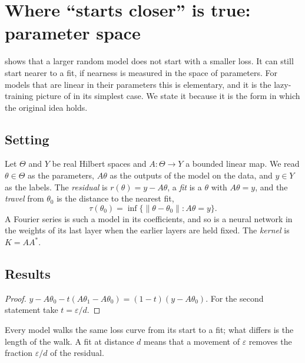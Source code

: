 \section{Where ``starts closer'' is true: parameter space}
\label{sec:param}

 shows that a larger random model does not start with a
smaller loss. It can still start nearer to a fit, if nearness is measured in the
space of parameters. For models that are linear in their parameters this is
elementary, and it is the lazy-training picture of
\citet{jacot2018ntk,chizat2019lazy} in its simplest case. We state it because it
is the form in which the original idea holds.

\subsection{Setting}

Let $\Theta$ and $Y$ be real Hilbert spaces and $A:\Theta\to Y$ a bounded linear
map. We read $\theta\in\Theta$ as the parameters, $A\theta$ as the outputs of
the model on the data, and $y\in Y$ as the labels. The \emph{residual} is
$r(\theta)=y-A\theta$, a \emph{fit} is a $\theta$ with $A\theta=y$, and the
\emph{travel} from $\theta_0$ is the distance to the nearest fit,
\[
  \tau(\theta_0)=\inf\{\|\theta-\theta_0\|:A\theta=y\}.
\]
A Fourier series is such a model in its coefficients, and so is a neural
network in the weights of its last layer when the earlier layers are held
fixed. The \emph{kernel} is $K=AA^*$.

\subsection{Results}


\begin{proof}
$y-A\theta_0-t(A\theta_1-A\theta_0)=(1-t)(y-A\theta_0)$. For the second
statement take $t=\varepsilon/d$.
\end{proof}

Every model walks the same loss curve from its start to a fit; what differs is
the length of the walk. A fit at distance $d$ means that a movement of
$\varepsilon$ removes the fraction $\varepsilon/d$ of the residual.

